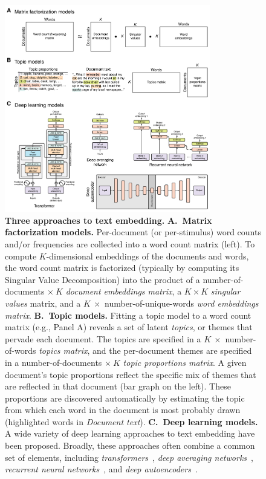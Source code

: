 \documentclass{article}
\begin{document}
\begin{figure}[tp]
\centering
\includegraphics[width=0.8\textwidth]{figs/word_embedding_models}
\caption{\textbf{Three approaches to text embedding.}  \textbf{A.~Matrix factorization models.} Per-document (or per-stimulus) word counts and/or frequencies are collected into a word count matrix (left).  To compute $K$-dimensional embeddings of the documents and words, the word count matrix is factorized (typically by computing its Singular Value Decomposition) into the product of a number-of-documents $\times~K$ \textit{document embeddings matrix}, a $K \times K$ \textit{singular values} matrix, and a $K~\times $ number-of-unique-words \textit{word embeddings matrix}.  \textbf{B.~Topic models.}  Fitting a topic model to a word count matrix (e.g., Panel A) reveals a set of latent \textit{topics}, or themes that pervade each document.  The topics are specified in a $K~\times$ number-of-words \textit{topics matrix}, and the per-document themes are specified in a number-of-documents $\times~K$ \textit{topic proportions matrix}. A given document's topic proportions reflect the specific mix of themes that are reflected in that document (bar graph on the left).  These proportions are discovered automatically by estimating the topic from which each word in the document is most probably drawn (highlighted words in \textit{Document text}).  \textbf{C.~Deep learning models.}  A wide variety of deep learning approaches to text embedding have been proposed.  Broadly, these approaches often combine a common set of elements, including \textit{transformers}~\citep[diagram adapted from][]{ViswEtal17}, \textit{deep averaging networks}~\citep[diagram adapted from][]{IyyeEtal15}, \textit{recurrent neural networks}~\citep[diagram adapted from][]{IyyeEtal15}, and \textit{deep autoencoders}~\citep[diagram adapted from][]{YousHame17}.}
\label{fig:embedding-models}
\end{figure}
\end{document}
